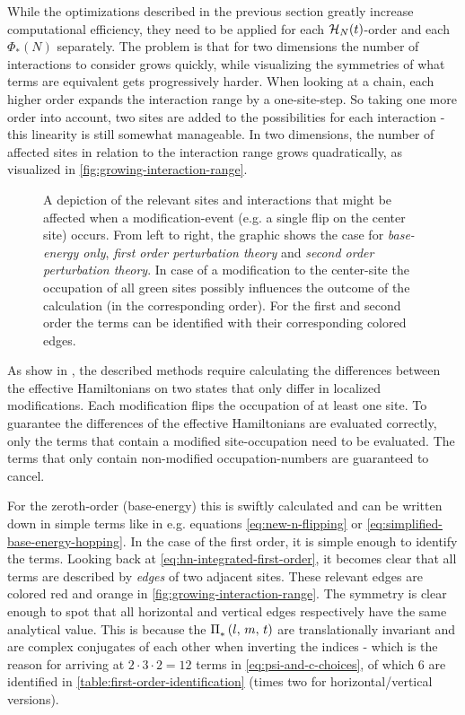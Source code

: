 While the optimizations described in the previous section greatly increase computational efficiency, they need to be applied for each $\mathcal{H}_{N}(t)$-order and each $\Phi_\ast(N)$ separately.
The problem is that for two dimensions the number of interactions to consider grows quickly, while visualizing the symmetries of what terms are equivalent gets progressively harder.
When looking at a chain, each higher order expands the interaction range by a one-site-step. 
So taking one more order into account, two sites are added to the possibilities for each interaction - this linearity is still somewhat manageable.
In two dimensions, the number of affected sites in relation to the interaction range grows quadratically, as visualized in \autoref{fig:growing-interaction-range}.

\begin{figure}[htbp]
    \centering
    
    \caption{
        A depiction of the relevant sites and interactions that might be affected when a modification-event (e.g. a single flip on the center site) occurs.
        From left to right, the graphic shows the case for \emph{base-energy only}, \emph{first order perturbation theory} and \emph{second order perturbation theory}.
        In case of a modification to the center-site the occupation of all green sites possibly influences the outcome of the calculation (in the corresponding order). For the first and second order the terms can be identified with their corresponding colored edges.
    }
    \label{fig:growing-interaction-range}
\end{figure}

As show in , the described methods require calculating the differences between the effective Hamiltonians on two states that only differ in localized modifications.
Each modification flips the occupation of at least one site. 
To guarantee the differences of the effective Hamiltonians are evaluated correctly, only the terms that contain a modified site-occupation need to be evaluated. 
The terms that only contain non-modified occupation-numbers are guaranteed to cancel.

For the zeroth-order (base-energy) this is swiftly calculated and can be written down in simple terms like in e.g. equations \ref{eq:new-n-flipping} or \ref{eq:simplified-base-energy-hopping}.
In the case of the first order, it is simple enough to identify the terms.
Looking back at \autoref{eq:hn-integrated-first-order}, it becomes clear that all terms are described by \emph{edges} of two adjacent sites.
These relevant edges are colored red and orange in \autoref{fig:growing-interaction-range}. 
The symmetry is clear enough to spot that all horizontal and vertical edges respectively have the same analytical value.
This is because the $\Pi^{}_\text{$\ast$}\left(l,\,m,\,t\right)$ are translationally invariant and are complex conjugates of each other when inverting the indices - which is the reason for arriving at $2\cdot 3 \cdot 2 = 12$ terms in \autoref{eq:psi-and-c-choices}, of which 6 are identified in \autoref{table:first-order-identification} (times two for horizontal/vertical versions).

